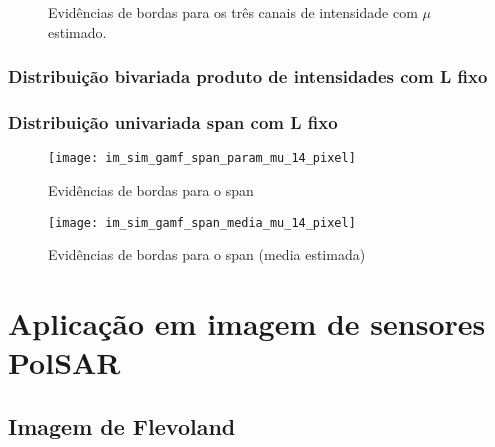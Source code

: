 \begin{figure*}[hbt]
	\centering
    \caption{Evidências de bordas para os três canais de intensidade com $\mu$ estimado.}
     \label{evidencias_hh_hv_vv_gamf} 
   \end{figure*}


\subsubsection{Distribuição bivariada produto de intensidades com L fixo}


\subsubsection{Distribuição univariada span com L fixo}    
    
\begin{figure}[hbt]
	\centering
	\texttt{[image: im\_sim\_gamf\_span\_param\_mu\_14\_pixel]}%
	\caption{Evidências de bordas para o span}
\label{fig:evidencias_span_gamf}
\end{figure}
    
    
    
\begin{figure}[hbt]
	\centering
	\texttt{[image: im\_sim\_gamf\_span\_media\_mu\_14\_pixel]}%
	\caption{Evidências de bordas para o span (media estimada)}
\label{fig:evidencias_span_gamf}
\end{figure}


\section{Aplicação em imagem de sensores PolSAR}

\subsection{Imagem de Flevoland}

